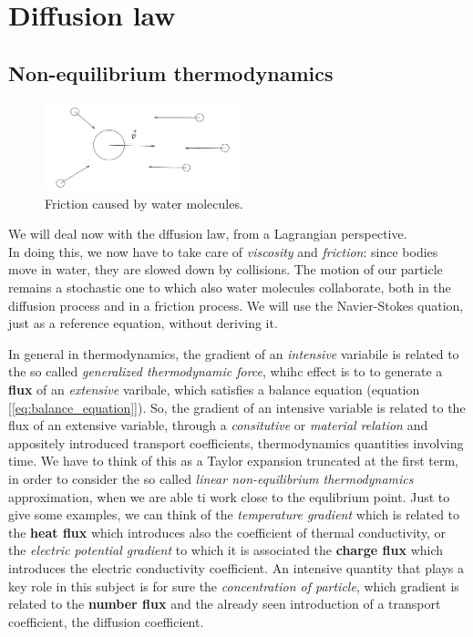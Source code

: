\documentclass[../main/main.tex]{subfiles}
\begin{document}
\section{Diffusion law}
\subsection{Non-equilibrium thermodynamics}


\begin{figure}
    \centering
    \includegraphics[width=0.5\textwidth]{../frontespizio/tikz/5_lesson/friction.png}
    \caption{\label{fig:friction} Friction caused by water molecules.}
\end{figure}

We will deal now with the dffusion law, from a Lagrangian perspective. \\
In doing this, we now have to take care of \emph{viscosity} and \emph{friction}: since bodies move in water, they are slowed down by collisions. The motion of our particle remains a stochastic one to which also water molecules collaborate, both in the diffusion process and in a friction process.
We will use the Navier-Stokes quation, just as a reference equation, without deriving it. 

In general in thermodynamics, the gradient of an \emph{intensive} variabile is related to the so called \emph{generalized thermodynamic force}, whihc effect is to to generate a \textbf{flux} of an \emph{extensive} varibale, which satisfies a balance equation (equation [\ref{eq:balance_equation}]). So, the gradient of an intensive variable is related to the flux of an extensive variable, through a \emph{consitutive} or \emph{material relation} and appositely introduced transport coefficients, thermodynamics quantities involving time. We have to think of this as a Taylor expansion truncated at the first term, in order to consider the so called \emph{linear non-equilibrium thermodynamics} approximation, when we are able ti work close to the equlibrium point.
Just to give some examples, we can think of the \emph{temperature gradient} which is related to the \textbf{heat flux} which introduces also the coefficient of thermal conductivity, or the \emph{electric potential gradient} to which it is associated the \textbf{charge flux} which introduces the electric conductivity coefficient. An intensive quantity that plays a key role in this subject is for sure the \emph{concentration of particle}, which gradient is related to the \textbf{number flux} and the already seen introduction of a transport coefficient, the diffusion coefficient.
\end{document}
